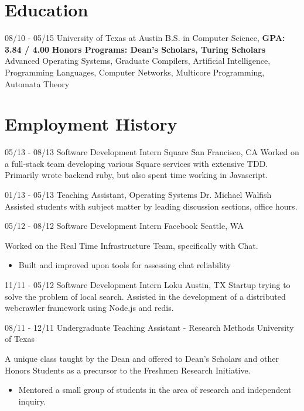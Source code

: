 \documentclass[11pt,letter,sans]{moderncv}
\begin{document}
\maketitle

\section{Education}
\cventry
{08/10 - 05/15}
{University of Texas at Austin}
{B.S. in Computer Science, \textbf{GPA: 3.84 / 4.00}}
{}
{}
{\textbf{Honors Programs: Dean's Scholars, Turing Scholars}}
{Advanced Operating Systems, Graduate Compilers, Artificial Intelligence,
Programming Languages, Computer Networks, Multicore Programming, Automata Theory}

\section{Employment History}
\cventry
{05/13 - 08/13}
{Software Development Intern}
{Square}
{San Francisco, CA}
{}
{Worked on a full-stack team developing various Square services with extensive
TDD. Primarily wrote backend ruby, but also spent time working in Javascript.
}

\cventry
{01/13 - 05/13}
{Teaching Assistant, Operating Systems}
{Dr. Michael Walfish}
{}
{}
{Assisted students with subject matter by leading discussion sections, office hours.}

\cventry
{05/12 - 08/12}
{Software Development Intern}
{Facebook}
{Seattle, WA}
{}
{Worked on the Real Time Infrastructure Team, specifically with Chat.
  \begin{itemize}
    \item Built and improved upon tools for assessing chat reliability
\end{itemize}}

\cventry
{11/11 - 05/12}
{Software Development Intern}
{Loku}
{Austin, TX}
{}
{Startup trying to solve the problem of local search. Assisted in the
development of a distributed webcrawler framework using Node.js and redis.}

\cventry
{08/11 - 12/11}
{Undergraduate Teaching Assistant - Research Methods}
{University of Texas}
{}
{}
{A unique class taught by the Dean and offered to Dean's Scholars and other
  Honors Students as a precursor to the Freshmen Research Initiative.
  \begin{itemize}
    \item Mentored a small group of students in the area of research and
      independent inquiry.
\end{itemize}}
\end{document}
